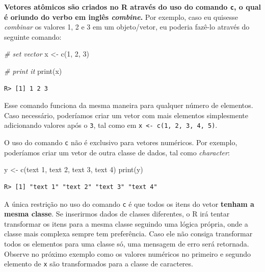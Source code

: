 \documentclass[
  11pt,
]{book}
\newenvironment{Shaded}{\begin{snugshade}}{\end{snugshade}}
\newcommand{\CommentTok}[1]{\textcolor[rgb]{0.37,0.37,0.37}{\textit{#1}}}
\newcommand{\DecValTok}[1]{\textcolor[rgb]{0.06,0.06,0.06}{#1}}
\newcommand{\FunctionTok}[1]{\textcolor[rgb]{0,0,0}{#1}}
\newcommand{\NormalTok}[1]{#1}
\newcommand{\OtherTok}[1]{\textcolor[rgb]{0.37,0.37,0.37}{#1}}
\newcommand{\StringTok}[1]{\textcolor[rgb]{0.5,0.5,0.5}{#1}}
\begin{document}
\textbf{Vetores atômicos são criados no R através do uso do comando \texttt{c}, o qual é oriundo do verbo em inglês \emph{combine}.} Por exemplo, caso eu quisesse \emph{combinar} os valores 1, 2 e 3 em um objeto/vetor, eu poderia fazê-lo através do seguinte comando: 

\begin{Shaded}
\begin{Highlighting}[]
\CommentTok{\# set vector}
\NormalTok{x }\OtherTok{\textless{}{-}} \FunctionTok{c}\NormalTok{(}\DecValTok{1}\NormalTok{, }\DecValTok{2}\NormalTok{, }\DecValTok{3}\NormalTok{)}

\CommentTok{\# print it}
\FunctionTok{print}\NormalTok{(x)}
\end{Highlighting}
\end{Shaded}

\begin{verbatim}
R> [1] 1 2 3
\end{verbatim}

Esse comando funciona da mesma maneira para qualquer número de elementos. Caso necessário, poderíamos criar um vetor com mais elementos simplesmente adicionando valores após o \texttt{3}, tal como em \texttt{x\ \textless{}-\ c(1,\ 2,\ 3,\ 4,\ 5)}.

O uso do comando \texttt{c} não é exclusivo para vetores numéricos. Por exemplo, poderíamos criar um vetor de outra classe de dados, tal como \emph{character}:

\begin{Shaded}
\begin{Highlighting}[]
\NormalTok{y }\OtherTok{\textless{}{-}} \FunctionTok{c}\NormalTok{(}\StringTok{\textquotesingle{}text 1\textquotesingle{}}\NormalTok{, }\StringTok{\textquotesingle{}text 2\textquotesingle{}}\NormalTok{, }\StringTok{\textquotesingle{}text 3\textquotesingle{}}\NormalTok{, }\StringTok{\textquotesingle{}text 4\textquotesingle{}}\NormalTok{)}
\FunctionTok{print}\NormalTok{(y)}
\end{Highlighting}
\end{Shaded}

\begin{verbatim}
R> [1] "text 1" "text 2" "text 3" "text 4"
\end{verbatim}

A única restrição no uso do comando \texttt{c} é que todos os itens do vetor \textbf{tenham a mesma classe}. Se inserirmos dados de classes diferentes, o R irá tentar transformar os itens para a mesma classe seguindo uma lógica própria, onde a classe mais complexa sempre tem preferência. Caso ele não consiga transformar todos os elementos para uma classe só, uma mensagem de erro será retornada. Observe no próximo exemplo como os valores numéricos no primeiro e segundo elemento de \texttt{x} são transformados para a classe de caracteres.
\end{document}
